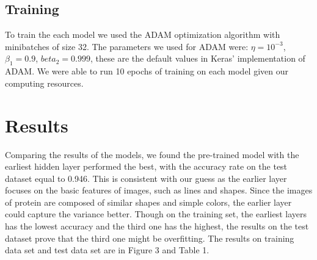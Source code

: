 \documentclass{article}
\begin{document}
\subsection{Training}
To train the each model we used the ADAM optimization algorithm\cite{kingma2014adam} with minibatches of size 32.
The parameters we used for ADAM were: $\eta = 10^{-3}$, $\beta_1 = 0.9$, $beta_2=0.999$, these
are the default values in Keras' implementation of ADAM.
We were able to run 10 epochs of training on each model given our computing resources. 
\section{Results}
Comparing the results of the models, we found the pre-trained model with the earliest hidden layer performed the best, with the accuracy rate on the test dataset equal to 0.946. This is consistent with our guess as the earlier layer focuses on the basic features of images, such as lines and shapes. Since the images of protein are composed of similar shapes and simple colors, the earlier layer could capture the variance better. Though on the training set, the earliest layers has the lowest accuracy and the third one has the highest, the results on the test dataset prove that the third one might be overfitting. The results on training data set and test data set are in Figure 3 and Table 1.
\end{document}
